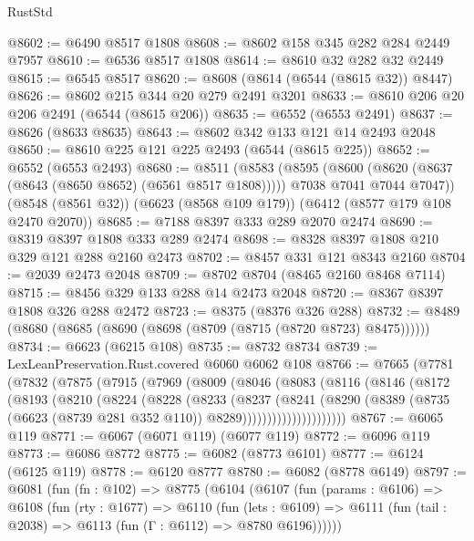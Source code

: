 \begin{lexlean}{RustStd}
\begin{coremodule}
@8602 := @6490 @8517 @1808
@8608 := @8602 @158 @345 @282 @284 @2449 @7957
@8610 := @6536 @8517 @1808
@8614 := @8610 @32 @282 @32 @2449
@8615 := @6545 @8517
@8620 := @8608 (@8614 (@6544 (@8615 @32)) @8447)
@8626 := @8602 @215 @344 @20 @279 @2491 @3201
@8633 := @8610 @206 @20 @206 @2491 (@6544 (@8615 @206))
@8635 := @6552 (@6553 @2491)
@8637 := @8626 (@8633 @8635)
@8643 := @8602 @342 @133 @121 @14 @2493 @2048
@8650 := @8610 @225 @121 @225 @2493 (@6544 (@8615 @225))
@8652 := @6552 (@6553 @2493)
@8680 := @8511
    (@8583
      (@8595
        (@8600 (@8620 (@8637 (@8643 (@8650 @8652) (@6561 @8517 @1808)))))
        @7038
        @7041
        @7044
        @7047))
    (@8548 (@8561 @32))
    (@6623 (@8568 @109 @179))
    (@6412 (@8577 @179 @108 @2470 @2070))
@8685 := @7188 @8397 @333 @289 @2070 @2474
@8690 := @8319 @8397 @1808 @333 @289 @2474
@8698 := @8328 @8397 @1808 @210 @329 @121 @288 @2160 @2473
@8702 := @8457 @331 @121 @8343 @2160
@8704 := @2039 @2473 @2048
@8709 := @8702 @8704 (@8465 @2160 @8468 @7114)
@8715 := @8456 @329 @133 @288 @14 @2473 @2048
@8720 := @8367 @8397 @1808 @326 @288 @2472
@8723 := @8375 (@8376 @326 @288)
@8732 := @8489 (@8680 (@8685 (@8690 (@8698 (@8709 (@8715 (@8720 @8723) @8475))))))
@8734 := @6623 (@6215 @108)
@8735 := @8732 @8734
@8739 := LexLeanPreservation.Rust.covered @6060 @6062 @108
@8766 := @7665
    (@7781
      (@7832
        (@7875
          (@7915
            (@7969
              (@8009
                (@8046
                  (@8083
                    (@8116
                      (@8146
                        (@8172
                          (@8193
                            (@8210
                              (@8224
                                (@8228
                                  (@8233
                                    (@8237
                                      (@8241
                                        (@8290
                                          (@8389
                                            (@8735
                                              (@6623 (@8739 @281 @352 @110))
                                              @8289)))))))))))))))))))))
@8767 := @6065 @119
@8771 := @6067 (@6071 @119) (@6077 @119)
@8772 := @6096 @119
@8773 := @6086 @8772
@8775 := @6082 (@8773 @6101)
@8777 := @6124 (@6125 @119)
@8778 := @6120 @8777
@8780 := @6082 (@8778 @6149)
@8797 := @6081
    (fun (fn : @102) =>
    @8775
      (@6104
        (@6107
          (fun (params : @6106) =>
          @6108
            (fun (rty : @1677) =>
            @6110
              (fun (lets : @6109) =>
              @6111 (fun (tail : @2038) => @6113 (fun (Γ : @6112) => @8780 @6196))))))

\end{coremodule}
\end{lexlean}
